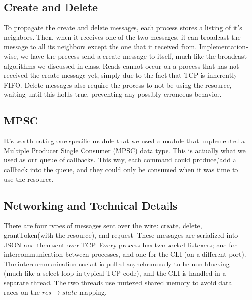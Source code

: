 \documentclass{article}
\begin{document}
\subsection*{Create and Delete}
To propagate the create and delete messages, each process stores a listing of it's neighbors. Then, when it receives one of the two messages, it can broadcast the message to all its neighbors except the one that it received from. Implementation-wise, we have the process send a create message to itself, much like the broadcast algorithms we discussed in class. Reads cannot occur on a process that has not received the create message yet, simply due to the fact that TCP is inherently FIFO. Delete messages also require the process to not be using the resource, waiting until this holds true, preventing any possibly erroneous behavior.

\subsection*{MPSC}
It's worth noting one specific module that we used a module that implemented a Multiple Producer Single Consumer (MPSC) data type. This is actually what we used as our queue of callbacks. This way, each command could produce/add a callback into the queue, and they could only be consumed when it was time to use the resource.

\subsection*{Networking and Technical Details}
There are four types of messages sent over the wire: create, delete, grantToken(with the resource), and request. These messages are serialized into JSON and then sent over TCP. Every process has two socket listeners; one for intercommunication between processes, and one for the CLI (on a different port). The intercommunication socket is polled asynchronously to be non-blocking (much like a select loop in typical TCP code), and the CLI is handled in a separate thread. The two threads use mutexed shared memory to avoid data races on the $res \to state$ mapping.
\end{document}
